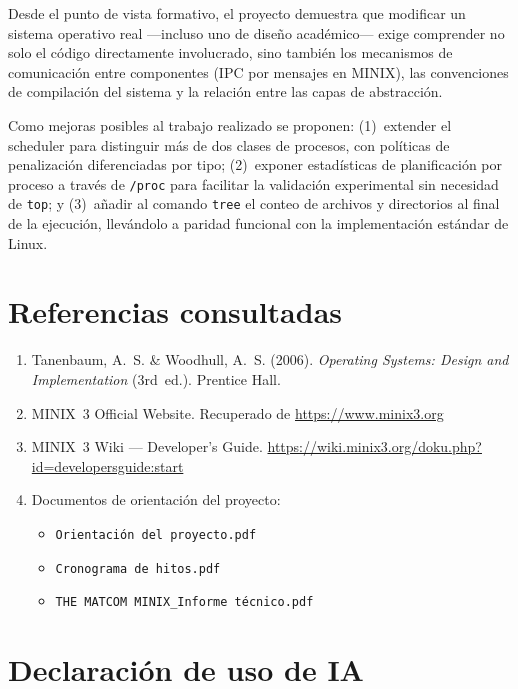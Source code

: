 \documentclass[11pt,a4paper]{article}
\begin{document}
Desde el punto de vista formativo, el proyecto demuestra que modificar un sistema operativo real ---incluso uno de dise\~no acad\'emico--- exige comprender no solo el c\'odigo directamente involucrado, sino tambi\'en los mecanismos de comunicaci\'on entre componentes (IPC por mensajes en MINIX), las convenciones de compilaci\'on del sistema y la relaci\'on entre las capas de abstracci\'on.

Como mejoras posibles al trabajo realizado se proponen: (1)~extender el scheduler para distinguir m\'as de dos clases de procesos, con pol\'iticas de penalizaci\'on diferenciadas por tipo; (2)~exponer estad\'isticas de planificaci\'on por proceso a trav\'es de \texttt{/proc} para facilitar la validaci\'on experimental sin necesidad de \texttt{top}; y (3)~a\~nadir al comando \texttt{tree} el conteo de archivos y directorios al final de la ejecuci\'on, llev\'andolo a paridad funcional con la implementaci\'on est\'andar de Linux.

\section{Referencias consultadas}

\begin{enumerate}[leftmargin=*]
  \item Tanenbaum, A.~S. \& Woodhull, A.~S. (2006). \emph{Operating Systems: Design and Implementation} (3rd~ed.). Prentice Hall.
  \item MINIX~3 Official Website. Recuperado de \url{https://www.minix3.org}
  \item MINIX~3 Wiki --- Developer's Guide. \url{https://wiki.minix3.org/doku.php?id=developersguide:start}
  \item Documentos de orientaci\'on del proyecto:
  \begin{itemize}
    \item \texttt{Orientaci\'on del proyecto.pdf}
    \item \texttt{Cronograma de hitos.pdf}
    \item \texttt{THE MATCOM MINIX\_Informe t\'ecnico.pdf}
  \end{itemize}
\end{enumerate}

\section{Declaraci\'on de uso de IA}
\end{document}
